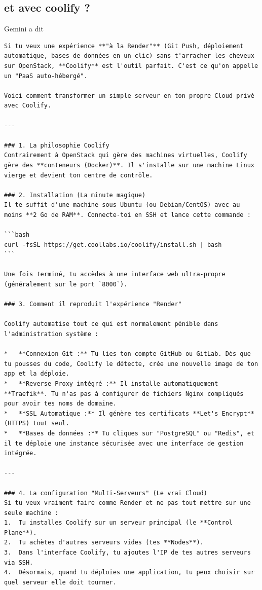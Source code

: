 \documentclass{report} %
\begin{document}
\subsection{ et avec coolify ?}
Gemini a dit
\begin{verbatim}
Si tu veux une expérience **"à la Render"** (Git Push, déploiement automatique, bases de données en un clic) sans t'arracher les cheveux sur OpenStack, **Coolify** est l'outil parfait. C'est ce qu'on appelle un "PaaS auto-hébergé".

Voici comment transformer un simple serveur en ton propre Cloud privé avec Coolify.

---

### 1. La philosophie Coolify
Contrairement à OpenStack qui gère des machines virtuelles, Coolify gère des **conteneurs (Docker)**. Il s'installe sur une machine Linux vierge et devient ton centre de contrôle.

### 2. Installation (La minute magique)
Il te suffit d'une machine sous Ubuntu (ou Debian/CentOS) avec au moins **2 Go de RAM**. Connecte-toi en SSH et lance cette commande :

```bash
curl -fsSL https://get.coollabs.io/coolify/install.sh | bash
```

Une fois terminé, tu accèdes à une interface web ultra-propre (généralement sur le port `8000`).

### 3. Comment il reproduit l'expérience "Render"

Coolify automatise tout ce qui est normalement pénible dans l'administration système :

*   **Connexion Git :** Tu lies ton compte GitHub ou GitLab. Dès que tu pousses du code, Coolify le détecte, crée une nouvelle image de ton app et la déploie.
*   **Reverse Proxy intégré :** Il installe automatiquement **Traefik**. Tu n'as pas à configurer de fichiers Nginx compliqués pour avoir tes noms de domaine.
*   **SSL Automatique :** Il génère tes certificats **Let's Encrypt** (HTTPS) tout seul.
*   **Bases de données :** Tu cliques sur "PostgreSQL" ou "Redis", et il te déploie une instance sécurisée avec une interface de gestion intégrée.

---

### 4. La configuration "Multi-Serveurs" (Le vrai Cloud)
Si tu veux vraiment faire comme Render et ne pas tout mettre sur une seule machine :
1.  Tu installes Coolify sur un serveur principal (le **Control Plane**).
2.  Tu achètes d'autres serveurs vides (tes **Nodes**).
3.  Dans l'interface Coolify, tu ajoutes l'IP de tes autres serveurs via SSH.
4.  Désormais, quand tu déploies une application, tu peux choisir sur quel serveur elle doit tourner.


\end{verbatim}
\end{document}
